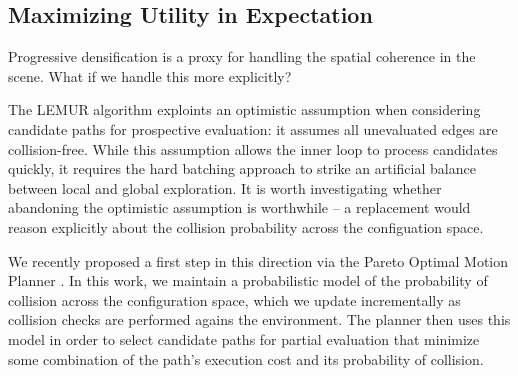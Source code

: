 \subsection{Maximizing Utility in Expectation}

Progressive densification is a proxy for handling the
spatial coherence in the scene.
What if we handle this more explicitly?

The LEMUR algorithm exploints an optimistic assumption when considering
candidate paths for prospective evaluation:
it assumes all unevaluated edges are collision-free.
While this assumption allows the inner loop to process candidates
quickly,
it requires the hard batching approach to strike an artificial
balance between local and global exploration.
It is worth investigating whether abandoning the optimistic
assumption is worthwhile --
a replacement would reason explicitly about the collision probability
across the configuation space.

We recently proposed a first step in this direction
via the Pareto Optimal Motion Planner \citep{choudhury2016pomp}.
In this work,
we maintain a probabilistic model of the probability of collision
across the configuration space,
which we update incrementally as collision checks are performed
agains the environment.
The planner then uses this model in order to select candidate paths
for partial evaluation that minimize some combination of the path's
execution cost and its probability of collision.



